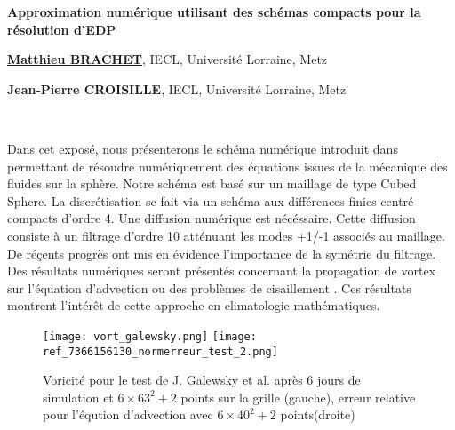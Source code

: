 \documentclass[10pt]{article}
\def\titre#1{\begin{center}{\Large{\bf #1}}\end{center}}
\def\orateur#1#2{\begin{center}{\underline{\large{\bf #1}}}, {#2}\end{center}}
\def\auteur#1#2{\begin{center}{\large{\bf #1}}, {#2}\end{center}}
\def\motscles#1{%
	\ifx#1\IsUndefined\relax\else\noindent{\normalsize{\bf Mots-cl\'es :}} #1\\ \fi}
\begin{document}
\thispagestyle{empty}

\def\Titre{Approximation numérique utilisant des schémas compacts pour la résolution d'EDP}
\def\NomOrateur{Matthieu BRACHET}
\def\AdresseCourteOrateur{IECL, Universit\'e Lorraine, Metz}
\def\AdresseLongueOrateur{Institut Elie Cartan de Lorraine, UMR 7502, Univ. Lorraine, Metz}
\def\EmailOrateur{email}

\def\NomAuteurI{Jean-Pierre CROISILLE}
\def\AdresseCourteAuteurI{IECL, Universit\'e Lorraine, Metz}
\def\AdresseLongueAuteurI{Institut Elie Cartan de Lorraine, UMR 7502, Univ. Lorraine, Metz}
\def\EmailAuteurI{jean-pierre.croisille@univ-lorraine.fr}

\titre{\Titre}%

\orateur{\NomOrateur}{\AdresseCourteOrateur}
\auteur{\NomAuteurI}{\AdresseCourteAuteurI}

\motscles{\listmotcles}

Dans cet exposé, nous présenterons le schéma numérique introduit dans \cite{Croisille2013, Croisille2015} permettant de résoudre numériquement des équations issues de la mécanique des fluides sur la sphère.
Notre schéma est basé sur un maillage de type Cubed Sphere. La discrétisation se fait via un schéma aux différences finies centré compacts d'ordre 4. Une diffusion numérique est nécéssaire. Cette diffusion consiste à un filtrage d'ordre 10 atténuant les modes +1/-1 associés au maillage. 
De réçents progrès ont mis en évidence l'importance de la symétrie du filtrage. Des résultats numériques seront présentés concernant la propagation de vortex sur l'équation d'advection \cite{Nair2008} ou des problèmes de cisaillement \cite{Galewsky2004}. Ces résultats montrent l'intérêt de cette approche en climatologie mathématiques.


\begin{figure}[ht]
\begin{center}
\texttt{[image: vort\_galewsky.png]}
\texttt{[image: ref\_7366156130\_normerreur\_test\_2.png]}
\end{center}
\caption{Voricité pour le test de J. Galewsky et al. \cite{Galewsky2004} après 6 jours de simulation et  $6 \times 63^2 + 2$ points sur la grille (gauche), erreur relative pour l'éqution d'advection \cite{Nair2008} avec $6 \times 40^2 + 2$ points(droite)}
\end{figure}
\end{document}
